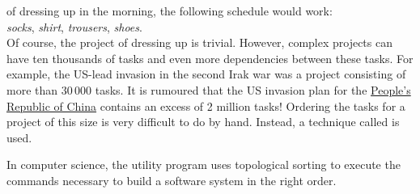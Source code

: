 of dressing up in the morning, the following schedule would work:
\\[0.2cm]
\hspace*{1.3cm}
\textsl{socks}, \textsl{shirt}, \textsl{trousers}, \textsl{shoes}.
\\[0.2cm]
Of course, the project of dressing up is trivial.
However, complex projects can have ten thousands of tasks and even more dependencies between these tasks.  For
example, the US-lead invasion in the second Irak war was a project consisting of more than $30\,000$ tasks.
It is rumoured that the US invasion plan for the \href{https://en.wikipedia.org/wiki/China}{People's Republic of China} 
contains an excess of 2 million tasks!  Ordering the tasks for a project of this size is very difficult to do by
hand.  Instead, a technique called  is used. 

In computer science, the utility program \href{https://edoras.sdsu.edu/doc/make.html}{} uses
topological sorting to execute the commands necessary to build a software system in the right order.

